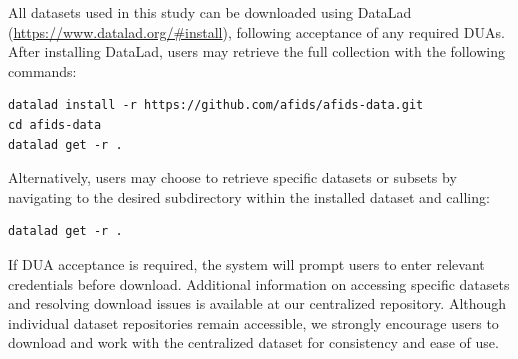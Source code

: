 All datasets used in this study can be downloaded using DataLad (\url{https://www.datalad.org/#install})\cite{datalad}, following acceptance of any required DUAs. After installing DataLad, users may retrieve the full collection with the following commands:
\begin{verbatim}
datalad install -r https://github.com/afids/afids-data.git
cd afids-data
datalad get -r .
\end{verbatim}

Alternatively, users may choose to retrieve specific datasets or subsets by navigating to the desired subdirectory within the installed dataset and calling:
\begin{verbatim}
datalad get -r .
\end{verbatim}

If DUA acceptance is required, the system will prompt users to enter relevant credentials before download. Additional information on accessing specific datasets and resolving download issues is available at our centralized repository\cite{afidsdata}. Although individual dataset repositories remain accessible, we strongly encourage users to download and work with the centralized dataset for consistency and ease of use.



